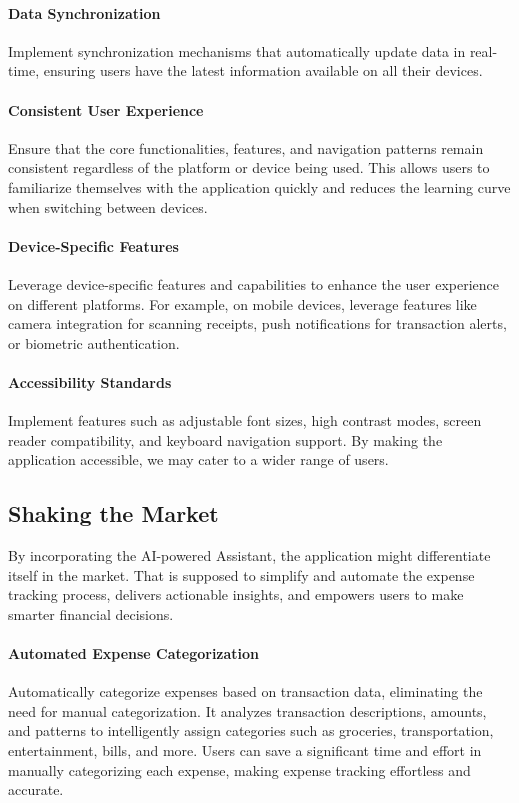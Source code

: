 \paragraph{Data Synchronization}
Implement synchronization mechanisms that automatically update data in real-time, ensuring users have the latest 
information available on all their devices.

\paragraph{Consistent User Experience}
Ensure that the core functionalities, features, and navigation patterns remain consistent regardless of the platform or 
device being used. This allows users to familiarize themselves with the application quickly and reduces the learning 
curve when switching between devices.

\paragraph{Device-Specific Features}
Leverage device-specific features and capabilities to enhance the user experience on different platforms. For 
example, on mobile devices, leverage features like camera integration for scanning receipts, push notifications 
for transaction alerts, or biometric authentication.

\paragraph{Accessibility Standards}
Implement features such as adjustable font sizes, high contrast modes, screen reader compatibility, and keyboard 
navigation support. By making the application accessible, we may cater to a wider range of users.


\subsection{Shaking the Market}

By incorporating the AI-powered Assistant, the application might differentiate itself in the market. That is supposed 
to simplify and automate the expense tracking process, delivers actionable insights, and empowers users to make 
smarter financial decisions. 

\paragraph{Automated Expense Categorization}
Automatically categorize expenses based on transaction data, eliminating the need for manual categorization. 
It analyzes transaction descriptions, amounts, and patterns to intelligently assign categories such as groceries, 
transportation, entertainment, bills, and more. Users can save a significant time and effort in manually categorizing 
each expense, making expense tracking effortless and accurate.

